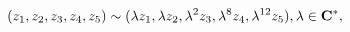 \begin{equation}
\label{eq:def}
(z_1,z_2,z_3,z_4,z_5)\sim(\lambda z_1,\lambda z_2,\lambda^2 z_3,\lambda^8 z_4,\lambda^{12}
z_5), \lambda\in{\bf C}^*,
\end{equation}

